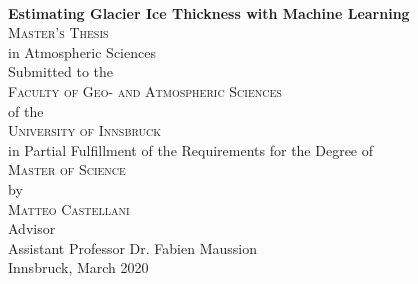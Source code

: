 \begin{titlepage}
\begin{center}

~\\[15mm]
{\Huge  {\bf Estimating Glacier Ice Thickness with Machine Learning}}\\[5mm]




{\Large \textsc{Master's Thesis}} \\[15mm]


{\large in Atmospheric Sciences} \\[15mm]


{\large Submitted to the} \\[2mm]
{\Large \textsc{Faculty of Geo- and Atmospheric Sciences}} \\[2mm]
{\large of the} \\[2mm]
{\Large \textsc{University of Innsbruck}} \\[15mm]


{\large in Partial Fulfillment of the Requirements for the Degree of} \\[2mm]
{\Large \textsc{Master of Science}} \\[15mm]


{\large by} \\[2mm]
{\Large \textsc{Matteo Castellani}} \\[15mm]


{\large Advisor} \\[2mm]
{\large Assistant Professor Dr. Fabien Maussion} \\[15mm]


{\large Innsbruck, March 2020}


\end{center}
\end{titlepage}
